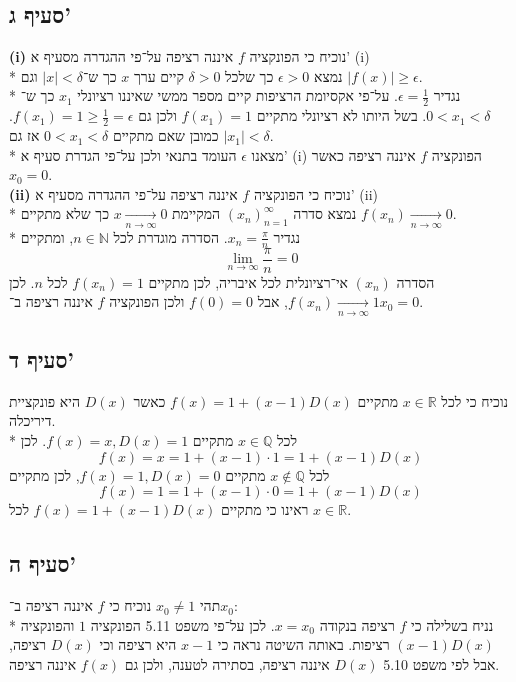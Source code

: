 \documentclass[a4paper]{article}
\def\NN{\mathbb{N}}
\def\RR{\mathbb{R}}
\def\QQ{\mathbb{Q}}
\begin{document}
\subsection{סעיף ג'}
\textbf{(i)}
נוכיח כי הפונקציה $f$ איננה רציפה על־פי ההגדרה מסעיף א' (i) \\*
נמצא $\epsilon > 0$ כך שלכל $\delta > 0$ קיים ערך $x$ כך ש־$|x| < \delta$ וגם $|f(x)| \ge \epsilon$. \\*
נגדיר $\epsilon = \frac{1}{2}$.
על־פי אקסיומת הרציפות קיים מספר ממשי שאיננו רציונלי $x_1$ כך ש־$0 < x_1 < \delta$.
בשל היותו לא רציונלי מתקיים $f(x_1) = 1$ ולכן גם $f(x_1) = 1 \ge \frac{1}{2} = \epsilon$.
כמובן שאם מתקיים $0 < x_1 < \delta$ אז גם $|x_1| < \delta$. \\*
מצאנו $\epsilon$ העומד בתנאי ולכן על־פי הגדרת סעיף א' (i) הפונקציה $f$ איננה רציפה כאשר $x_0 = 0$. \\
\textbf{(ii)}
נוכיח כי הפונקציה $f$ איננה רציפה על־פי ההגדרה מסעיף א' (ii) \\*
נמצא סדרה ${(x_n)}_{n = 1}^\infty$ המקיימת $x \underset{n \to \infty}{\rightarrow} 0$ כך שלא מתקיים $f(x_n) \underset{n \to \infty}{\rightarrow} 0$. \\*
נגדיר $x_n = \frac{\pi}{n}$. הסדרה מוגדרת לכל $n \in \NN$, ומתקיים
\[
	\lim_{n \to \infty} \frac{\pi}{n} = 0
\]
הסדרה ${(x_n)}$ אי־רציונלית לכל איבריה, לכן מתקיים $f(x_n) = 1$ לכל $n$.
לכן $f(x_n) \underset{n \to \infty}{\rightarrow} 1$, אבל $f(0) = 0$ ולכן הפונקציה $f$ איננה רציפה ב־$x_0 = 0$.

\subsection{סעיף ד'}
נוכיח כי לכל $x \in \RR$ מתקיים $f(x) = 1 + (x - 1)D(x)$ כאשר $D(x)$ היא פונקציית דיריכלה. \\*
לכל $x \in \QQ$ מתקיים $f(x) = x, D(x) = 1$. לכן
\[
	f(x) = x = 1 + (x - 1) \cdot 1 = 1 + (x - 1) D(x)
\]
לכל $x \notin \QQ$ מתקיים $f(x) = 1, D(x) = 0$, לכן מתקיים
\[
	f(x) = 1 = 1 + (x - 1) \cdot 0 = 1 + (x - 1) D(x)
\]
ראינו כי מתקיים $f(x) = 1 + (x - 1)D(x)$ לכל $x \in \RR$.

\subsection{סעיף ה'}
תהי $x_0 \ne 1$ נוכיח כי $f$ איננה רציפה ב־$x_0$: \\*
נניח בשלילה כי $f$ רציפה בנקודה $x = x_0$.
לכן על־פי משפט 5.11 הפונקציה $1$ והפונקציה $(x - 1) D(x)$ רציפות.
באותה השיטה נראה כי $x - 1$ היא רציפה וכי $D(x)$ רציפה,
אבל לפי משפט 5.10 $D(x)$ איננה רציפה, בסתירה לטענה, ולכן גם $f(x)$ איננה רציפה.
\end{document}

